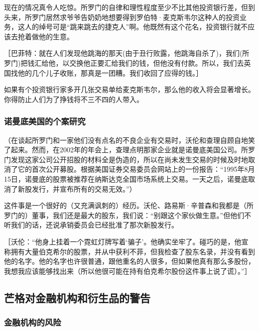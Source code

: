 现在的情况真令人吃惊。所罗门的自律和理性程度至少不比其他投资银行差，但到头来，所罗门居然求爷爷告奶奶地想要得到罗伯特·麦克斯韦尔这种人的投资业务，这人的绰号可是“跳来跳去的捷克人”啊。他既然有这个花名，投资银行就不应该去抢着做他的生意。
\par

［巴菲特：就在人们发现他跳海的那天(由于丑行败露，他跳海自杀了)，我们(所罗门)把钱汇给他，以交换他正要汇给我们的钱，但他没有付款。所以，我们去英国找他的几个儿子收账，那真是一团糟。我们收回了应得的钱。］
\par

如果有个投资银行家多开几张交易单给麦克斯韦尔，那么他的收入将会显著增长。你得防止人们为了挣钱将不三不四的人带入。
\par

\subsubsection*{诺曼底美国的个案研究}

（在谈起所罗门和一家他们没有点名的不良企业有交易时，沃伦和查理自顾自地笑了起来。然而，在2002年的年会上，查理点明那家企业就是诺曼底美国公司。所罗门发现这家公司公开招股的材料全是伪造的，所以在尚未发生交易的时候及时地取消了它的首次公开募股。根据美国证券交易委员会网站上的一份报告：“1995年8月15日，诺曼底的股票被推荐在纳斯达克全国市场系统上交易。一天之后，诺曼底取消了新股发行，并宣布所有的交易无效。”）
\par

这件事是一个很好的（又充满讽刺的）经历。沃伦、路易斯·辛普森和我都是（所罗门的）董事，我们还是最大的股东，我们说：“别跟这个家伙做生意。”但他们不听我们的话，还说承销委员会已经批准了那次新股发行。
\par

［沃伦：“他身上挂着一个霓虹灯牌写着‘骗子’。他确实坐牢了。碰巧的是，他宣称拥有大量伯克希尔的股票，并从中获利不菲，但我检查了股东名录，并没有看到他的名字。他的名字也许很普通，跟他重名的人很多，但如果他真有那么多股份，我想我应该能够找出来（所以他很可能在持有伯克希尔股份这件事上说了谎）。”］
\par

\subsection*{芒格对金融机构和衍生品的警告}

\subsubsection*{金融机构的风险}

